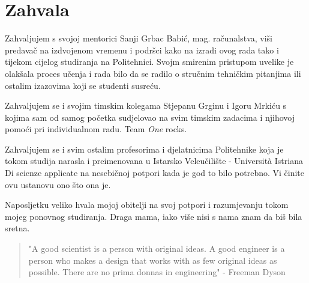 \chapter*{Zahvala}
Zahvaljujem s svojoj mentorici Sanji Grbac Babić, mag. računalstva, viši predavač na izdvojenom vremenu i podršci kako na izradi ovog rada tako i tijekom cijelog studiranja na Politehnici.
Svojm smirenim pristupom uvelike je olakšala proces učenja i rada bilo da se radilo o stručnim tehničkim pitanjima ili ostalim izazovima koji se studenti susreću.

Zahvaljujem se i svojim timskim kolegama Stjepanu Grginu i Igoru \mbox{Mrkiću} s kojima sam od samog početka sudjelovao na svim timskim zadacima i njihovoj pomoći pri individualnom radu. 
Team \textit{One} rocks.

Zahvaljujem se i svim ostalim profesorima i djelatnicima Politehnike koja je tokom studija narasla i preimenovana u Istarsko Veleučilište - Universit\`{a} Istriana Di scienze applicate na nesebičnoj potpori kada je god to bilo potrebno.
Vi činite ovu ustanovu ono što ona je.

Naposljetku veliko hvala mojoj obitelji na svoj potpori i razumjevanju tokom mojeg ponovnog studiranja.
Draga mama, iako više nisi s nama znam da biš bila sretna.

\vspace*{2cm}

\begin{quotation}
"A good scientist is a person with original ideas. A good engineer is a person who makes a design that works with as few original ideas as possible. There are no prima donnas in engineering" - Freeman Dyson
\end{quotation}